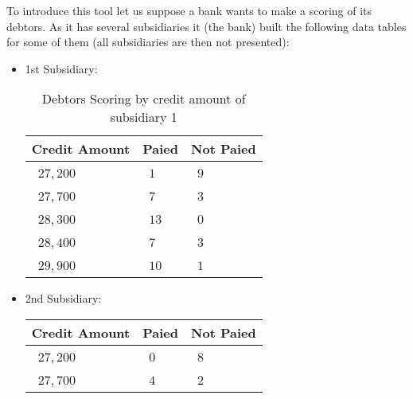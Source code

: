 	
	\pagebreak
		To introduce this tool let us suppose a bank wants to make a scoring of its debtors. As it has several subsidiaries it (the bank) built the following data tables for some of them (all subsidiaries are then not presented):
	\begin{itemize}
    	\item 1st Subsidiary:
		\begin{table}[H]
		\begin{center}
				\begin{tabular}{|p{2cm}|p{2cm}|p{2cm}|}
					\hline
					\multicolumn{1}{c}{\cellcolor{black!30}\textbf{Credit Amount}} & 
	  \multicolumn{1}{c}{\cellcolor{black!30}\textbf{Paied}}  & \multicolumn{1}{c}{\cellcolor{black!30}\textbf{Not Paied}}\\ \hline
					\centering\arraybackslash\ $27,200$ & \centering\arraybackslash\ $1$ & \centering\arraybackslash\ $9$ \\ \hline
					\centering\arraybackslash\ $27,700$ & \centering\arraybackslash\ $7$ & \centering\arraybackslash\ $3$ \\ \hline
					\centering\arraybackslash\ $28,300$ & \centering\arraybackslash\ $13$ & \centering\arraybackslash\ $0$ \\ \hline
					\centering\arraybackslash\ $28,400$ & \centering\arraybackslash\ $7$ & \centering\arraybackslash\ $3$ \\ \hline
					\centering\arraybackslash\ $29,900$ & \centering\arraybackslash\ $10$ & \centering\arraybackslash\ $1$ \\ \hline
			\end{tabular}
		\end{center}
		\caption[]{Debtors Scoring by credit amount of subsidiary 1}
		\end{table}
		\item 2nd Subsidiary:
			\begin{table}[H]
			\begin{center}
				\definecolor{gris}{gray}{0.85}
				\begin{tabular}{|p{2cm}|p{2cm}|p{2cm}|}
						\hline
						\multicolumn{1}{c}{\cellcolor{black!30}\textbf{Credit Amount}} & 
		  \multicolumn{1}{c}{\cellcolor{black!30}\textbf{Paied}}  & \multicolumn{1}{c}{\cellcolor{black!30}\textbf{Not Paied}}\\ \hline
						\centering\arraybackslash\ $27,200$ & \centering\arraybackslash\ $0$ & \centering\arraybackslash\ $8$ \\ \hline
						\centering\arraybackslash\ $27,700$ & \centering\arraybackslash\ $4$ & \centering\arraybackslash\ $2$ \\ \hline

\end{tabular}
\end{center}
\end{table}
\end{itemize}
